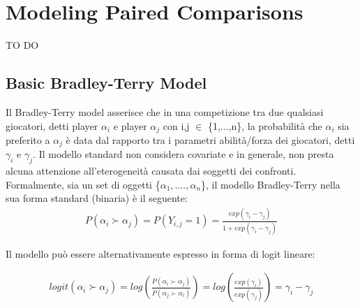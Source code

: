 \chapter{Modeling Paired Comparisons}

TO DO

\section{Basic Bradley-Terry Model}
Il Bradley-Terry model \autocite{bradley1952rank} asserisce che in una competizione tra due qualsiasi giocatori, detti player $\alpha_{i}$ e player $\alpha_{j}$ con i,j $\in$ \{1,...,n\}, la probabilità che $\alpha_{i}$ sia preferito a $\alpha_{j}$ è data dal rapporto tra i parametri abilità/forza dei giocatori, detti $\gamma_{i}$ e $\gamma_{j}$. Il modello standard non considera covariate e in generale, non presta alcuna attenzione all'eterogeneità causata dai soggetti dei confronti.\\


Formalmente, sia un set di oggetti \{$\alpha_{1},....,\alpha_{n}$\}, il modello Bradley-Terry nella sua forma standard (binaria) è il seguente: 
\begin{align} 
	P(\alpha_{i} \succ \alpha_{j}) = P(Y_{i,j} = 1) = \frac{exp(\gamma_{i} - \gamma_{j})}{1 + exp(\gamma_{i} - \gamma_{j})} \label{for:3.1} 
\end{align}

Il modello può essere alternativamente espresso in forma di logit lineare:

\begin{align}
		logit(\alpha_{i} \succ \alpha_{j}) =  log( \frac{P( \alpha_{i} \succ \alpha_{j})}{P( \alpha_{j} \succ \alpha_{i})} ) = log(\frac{exp(\gamma_{i})}{exp(\gamma_{j})}) = \gamma_i - \gamma_j 
\end{align}

